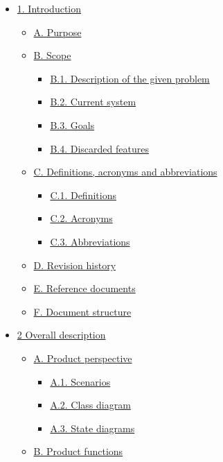 \documentclass[
]{article}
\providecommand{\tightlist}{%
  \setlength{\itemsep}{0pt}\setlength{\parskip}{0pt}}
\begin{document}
\begin{itemize}
\tightlist
\item
  \protect\hyperlink{1-introduction}{1. Introduction}

  \begin{itemize}
  \tightlist
  \item
    \protect\hyperlink{a-purpose}{A. Purpose}
  \item
    \protect\hyperlink{b-scope}{B. Scope}

    \begin{itemize}
    \tightlist
    \item
      \protect\hyperlink{b1-description-of-the-given-problem}{B.1.
      Description of the given problem}
    \item
      \protect\hyperlink{b2-current-system}{B.2. Current system}
    \item
      \protect\hyperlink{b3-goals}{B.3. Goals}
    \item
      \protect\hyperlink{b4-discarded-features}{B.4. Discarded features}
    \end{itemize}
  \item
    \protect\hyperlink{c-definitions-acronyms-and-abbreviations}{C.
    Definitions, acronyms and abbreviations}

    \begin{itemize}
    \tightlist
    \item
      \protect\hyperlink{c1-definitions}{C.1. Definitions}
    \item
      \protect\hyperlink{c2-acronyms}{C.2. Acronyms}
    \item
      \protect\hyperlink{c3-abbreviations}{C.3. Abbreviations}
    \end{itemize}
  \item
    \protect\hyperlink{d-revision-history}{D. Revision history}
  \item
    \protect\hyperlink{e-reference-documents}{E. Reference documents}
  \item
    \protect\hyperlink{f-document-structure}{F. Document structure}
  \end{itemize}
\item
  \protect\hyperlink{2-overall-description}{2 Overall description}

  \begin{itemize}
  \tightlist
  \item
    \protect\hyperlink{a-product-perspective}{A. Product perspective}

    \begin{itemize}
    \tightlist
    \item
      \protect\hyperlink{a1-scenarios}{A.1. Scenarios}
    \item
      \protect\hyperlink{a2-class-diagram}{A.2. Class diagram}
    \item
      \protect\hyperlink{a3-state-diagrams}{A.3. State diagrams}
    \end{itemize}
  \item
    \protect\hyperlink{b-product-functions}{B. Product functions}


\end{itemize}
\end{itemize}
\end{document}
